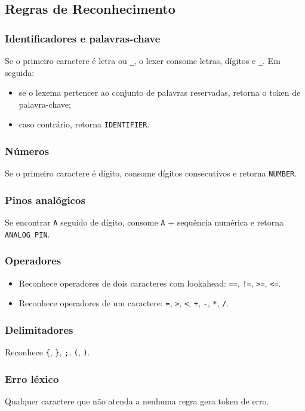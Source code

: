 \documentclass[12pt,a4paper]{article}
\begin{document}
\subsection{Regras de Reconhecimento}
\subsubsection{Identificadores e palavras-chave}
Se o primeiro caractere é letra ou \texttt{\_}, o lexer consome letras, dígitos e \texttt{\_}. Em seguida:
\begin{itemize}
  \item se o lexema pertencer ao conjunto de palavras reservadas, retorna o token de palavra-chave;
  \item caso contrário, retorna \texttt{IDENTIFIER}.
\end{itemize}

\subsubsection{Números}
Se o primeiro caractere é dígito, consome dígitos consecutivos e retorna \texttt{NUMBER}.

\subsubsection{Pinos analógicos}
Se encontrar \texttt{A} seguido de dígito, consome \texttt{A} + sequência numérica e retorna \texttt{ANALOG\_PIN}.

\subsubsection{Operadores}
\begin{itemize}
  \item Reconhece operadores de dois caracteres com lookahead: \texttt{==}, \texttt{!=}, \texttt{>=}, \texttt{<=}.
  \item Reconhece operadores de um caractere: \texttt{=}, \texttt{>}, \texttt{<}, \texttt{+}, \texttt{-}, \texttt{*}, \texttt{/}.
\end{itemize}

\subsubsection{Delimitadores}
Reconhece \texttt{\{}, \texttt{\}}, \texttt{;}, \texttt{(}, \texttt{)}.

\subsubsection{Erro léxico}
Qualquer caractere que não atenda a nenhuma regra gera token de erro.
\end{document}
